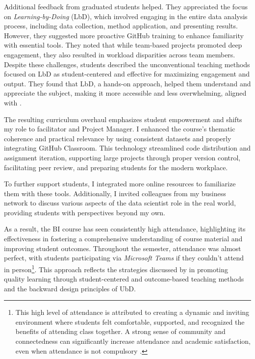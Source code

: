 \documentclass{article}
\begin{document}
Additional feedback from graduated students helped. They appreciated the focus on \textit{Learning-by-Doing} (LbD), which involved engaging in the entire data analysis process, including data collection, method application, and presenting results. However, they suggested more proactive GitHub training to enhance familiarity with essential tools. They noted that while team-based projects promoted deep engagement, they also resulted in workload disparities across team members.
Despite these challenges, students described the unconventional teaching methods focused on LbD as student-centered and effective for maximizing engagement and output. They found that LbD, a hands-on approach, helped them understand and appreciate the subject, making it more accessible and less overwhelming, aligned with \cite{kolb1984experiential}.

The resulting curriculum overhaul emphasizes student empowerment and shifts my role to facilitator and Project Manager. I enhanced the course's thematic coherence and practical relevance by using consistent datasets and properly integrating GitHub Classroom. This technology streamlined code distribution and assignment iteration, supporting large projects through proper version control, facilitating peer review, and preparing students for the modern workplace.

To further support students, I integrated more online resources to familiarize them with these tools. Additionally, I invited colleagues from my business network to discuss various aspects of the data scientist role in the real world, providing students with perspectives beyond my own.

As a result, the BI course has seen consistently high attendance, highlighting its effectiveness in fostering a comprehensive understanding of course material and improving student outcomes. Throughout the semester, attendance was almost perfect, with students participating via \textit{Microsoft Teams} if they couldn't attend in person\footnote{This high level of attendance is attributed to creating a dynamic and inviting environment where students felt comfortable, supported, and recognized the benefits of attending class together. A strong sense of community and connectedness can significantly increase attendance and academic satisfaction, even when attendance is not compulsory \cite{freeman2007sense}.}. This approach reflects the strategies discussed by \cite{biggs_constructive, biggs_university} in promoting quality learning through student-centered and outcome-based teaching methods and the backward design principles of UbD.
\end{document}
